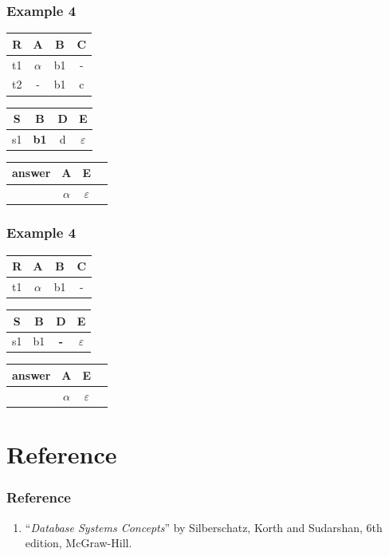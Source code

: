 \documentclass{beamer}
\begin{document}
\begin{frame}
  \frametitle{Example 4}

  \begin{tabular}{ c | c c c}
  R & A & B & C \\
  \hline
  t1 & $\alpha$  & b1  & - \\
  t2 & -  & b1  & c \\
  \end{tabular}
   \begin{tabular}{ c | c c c}
  S & B & D & E \\
  \hline
  s1 & \textbf{b1}  & d  & $\varepsilon$ \\
  \end{tabular}
  \begin{tabular}{ c | c c c}
  answer & A & E \\
  \hline
   & $\alpha$& $\varepsilon$\\
  \end{tabular}
\end{frame}
\begin{frame}
  \frametitle{Example 4}

  \begin{tabular}{ c | c c c}
  R & A & B & C \\
  \hline
  t1 & $\alpha$  & b1  & - \\
  \end{tabular}
   \begin{tabular}{ c | c c c}
  S & B & D & E \\
  \hline
  s1 & b1  & \textbf{-}  & $\varepsilon$ \\
  \end{tabular}
  \begin{tabular}{ c | c c c}
  answer & A & E \\
  \hline
   & $\alpha$& $\varepsilon$\\
  \end{tabular}
\end{frame}

\section{Reference}
\begin{frame}[fragile]
\frametitle{Reference}
\begin{enumerate}
\item ``\textit{Database Systems Concepts}'' by Silberschatz, Korth and Sudarshan,
6th edition, McGraw-Hill.
\end{enumerate}
\end{frame}
\end{document}
